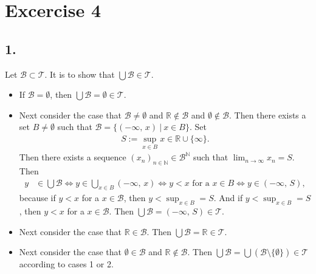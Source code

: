 \documentclass{article}
\begin{document}
\section*{Excercise 4}
\label{sec:Ex4}

\subsection*{1.}

Let $\mathcal{B} \subset \mathcal{T}$.
It is to show that $\bigcup \mathcal{B} \in \mathcal{T}$.
\begin{itemize}
\item If $\mathcal{B} = \emptyset$, then $\bigcup \mathcal{B} = \emptyset \in \mathcal{T} $.
\item 
    Next consider the case that $\mathcal{B} \neq \emptyset $ and $\mathbb{R} \notin \mathcal{B}$ and $\emptyset \notin \mathcal{B}$.
    Then there exists a set $B \neq \emptyset$ such that $\mathcal{B} = \{(-\infty ,\, x) \ | \ x \in B\}.$
    Set 
    \begin{align*}
    S := \sup_{x \in B} x \in \mathbb{R} \cup \{\infty\}.
    \end{align*}
    Then there exists a sequence $\left(  x_{n} \right)_{n \in \mathbb{N}} \in \mathcal{B}^{\mathbb{N}}$ such that $\lim_{n \rightarrow \infty} x_{n} = S$.
    Then
    \begin{align*}
    y & \in \bigcup \mathcal{B}
        \Leftrightarrow y \in \bigcup_{x \in B} (-\infty ,\, x)
        \Leftrightarrow y < x \text{ for a } x \in B
        \Leftrightarrow y \in (-\infty ,\, S), 
    \end{align*}
    because if $y < x$ for a $x \in \mathcal{B}$, then $ y <  \sup_{x \in B} = S $.
    And if $ y <  \sup_{x \in B} = S $, then $y < x$ for a $ x \in \mathcal{B} $.
    Then $\bigcup \mathcal{B} = (-\infty ,\, S) \in \mathcal{T}$.
  \item
    Next consider the case that $\mathbb{R} \in \mathcal{B}$.
    Then $\bigcup \mathcal{B} = \mathbb{R} \in \mathcal{T}$.
  \item
    Next consider the case that $\emptyset \in \mathcal{B}$ and $\mathbb{R} \notin \mathcal{B}$.
Then $\bigcup \mathcal{B} = \bigcup \left( \mathcal{B} \setminus \{ \emptyset \} \right) \in \mathcal{T}$ according to cases 1 or 2.
\end{itemize}
\end{document}
